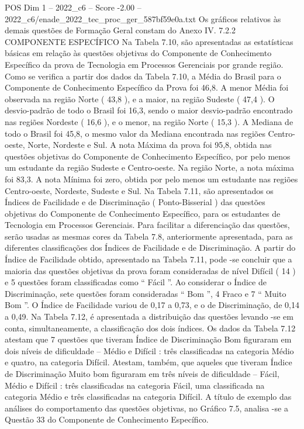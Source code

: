 \begin{textsample}{POS Dim 1 – 2022\_c6 – Score -2.00 – 2022\_c6/enade\_2022\_tec\_proc\_ger\_587bf59e0a.txt}
Os gráficos relativos às demais questões de Formação Geral constam do Anexo IV. 7.2.2 COMPONENTE ESPECÍFICO Na Tabela 7.10, são apresentadas as estatísticas básicas em relação às questões objetivas do Componente de Conhecimento Específico da prova de Tecnologia em Processos Gerenciais por grande região.
Como se verifica a partir dos dados da Tabela 7.10, a Média do Brasil para o Componente de Conhecimento Específico da Prova foi 46,8.
A menor Média foi observada na região Norte ( 43,8 ), e a maior, na região Sudeste ( 47,4 ).
O desvio-padrão de todo o Brasil foi 16,3, sendo o maior desvio-padrão encontrado nas regiões Nordeste ( 16,6 ), e o menor, na região Norte ( 15,3 ).
A Mediana de todo o Brasil foi 45,8, o mesmo valor da Mediana encontrada nas regiões Centro-oeste, Norte, Nordeste e Sul.
A nota Máxima da prova foi 95,8, obtida nas questões objetivas do Componente de Conhecimento Específico, por pelo menos um estudante da região Sudeste e Centro-oeste.
Na região Norte, a nota máxima foi 83,3.
A nota Mínima foi zero, obtida por pelo menos um estudante nas regiões Centro-oeste, Nordeste, Sudeste e Sul.
Na Tabela 7.11, são apresentados os Índices de Facilidade e de Discriminação ( Ponto-Bisserial ) das questões objetivas do Componente de Conhecimento Específico, para os estudantes de Tecnologia em Processos Gerenciais.
Para facilitar a diferenciação das questões, serão usadas as mesmas cores da Tabela 7.8, anteriormente apresentada, para as diferentes classificações dos Índices de Facilidade e de Discriminação.
A partir do Índice de Facilidade obtido, apresentado na Tabela 7.11, pode -se concluir que a maioria das questões objetivas da prova foram consideradas de nível Difícil ( 14 ) e 5 questões foram classificadas como “ Fácil ”.
Ao considerar o Índice de Discriminação, sete questões foram consideradas “ Bom ”, 4 Fraco e 7 “ Muito Bom ”.
O Índice de Facilidade variou de 0,17 a 0,73, e o de Discriminação, de 0,14 a 0,49.
Na Tabela 7.12, é apresentada a distribuição das questões levando -se em conta, simultaneamente, a classificação dos dois índices.
Os dados da Tabela 7.12 atestam que 7 questões que tiveram Índice de Discriminação Bom figuraram em dois níveis de dificuldade – Médio e Difícil : três classificadas na categoria Médio e quatro, na categoria Difícil.
Atestam, também, que aqueles que tiveram Índice de Discriminação Muito bom figuraram em três níveis de dificuldade – Fácil, Médio e Difícil : três classificadas na categoria Fácil, uma classificada na categoria Médio e três classificadas na categoria Difícil.
A título de exemplo das análises do comportamento das questões objetivas, no Gráfico 7.5, analisa -se a Questão 33 do Componente de Conhecimento Específico.

\end{textsample}
